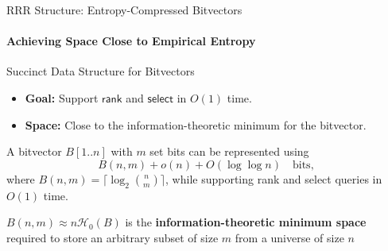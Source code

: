 \begin{frame}{RRR Structure: Entropy-Compressed Bitvectors}
    \framesubtitle{Achieving Space Close to Empirical Entropy}
    \begin{block}{Succinct Data Structure for Bitvectors}
        \begin{itemize}
            \item \textbf{Goal:} Support $\textsf{rank}$ and $\textsf{select}$ in $O(1)$ time.
            \item \textbf{Space:} Close to the information-theoretic minimum for the bitvector.
        \end{itemize}
    \end{block}
    \pause

    \begin{theorem}
        A bitvector $B[1..n]$ with $m$ set bits can be represented using
        \[ B(n, m) + o(n) + O(\log \log n) \quad \text{bits}, \]
        where $B(n, m) = \lceil \log_2 \binom{n}{m} \rceil$, while supporting \textsf{rank} and \textsf{select} queries in $O(1)$ time.
    \end{theorem}
    $B(n,m) \approx n \mathcal{H}_0(B)$ is the \textbf{information-theoretic minimum space} required to store an arbitrary subset of size $m$ from a universe of size $n$

\end{frame}




